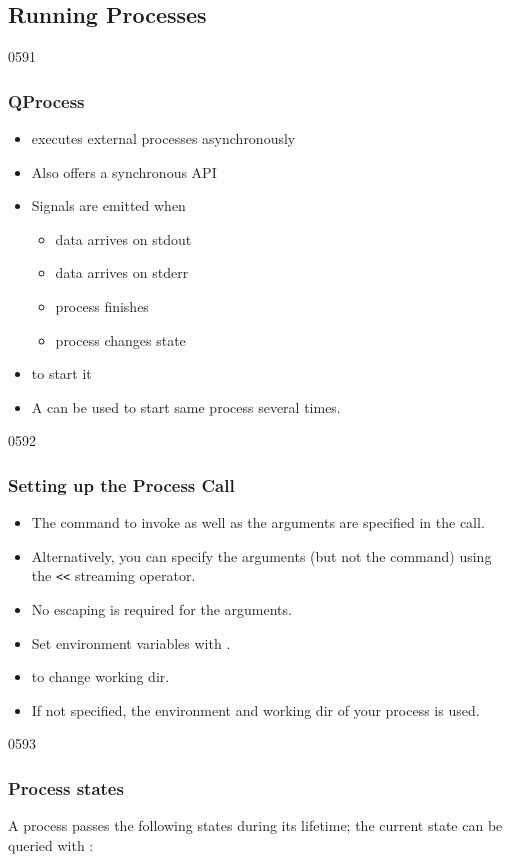 \subsection{Running Processes}\label{qprocess}

\begin{slide}[fragile]{0591}
\frametitle{QProcess}
\begin{itemize}
\item {} executes external processes asynchronously
\item Also offers a synchronous API
\item Signals are emitted when
\begin{itemize}
\item data arrives on stdout
\item data arrives on stderr
\item process finishes
\item process changes state
\end{itemize}
\item {} to start it
\item A  can be used to start same process several times.
\end{itemize}
\end{slide}

\begin{slide}{0592}
\frametitle{Setting up the Process Call}
\begin{itemize}
\item The command to invoke as well as the arguments are specified in
  the  call.
\item Alternatively, you can specify the arguments (but not the
  command) using the \texttt{<<} streaming operator.
\item No escaping is required for the arguments.
\item Set environment variables with .
\item {} to change working dir.
\item If not specified, the environment and working dir of your process is used.

\end{itemize}
\end{slide}

\begin{slide}{0593}
\frametitle{Process states}
A process passes the following states during its lifetime; the current
state can be queried with :

\end{slide}

